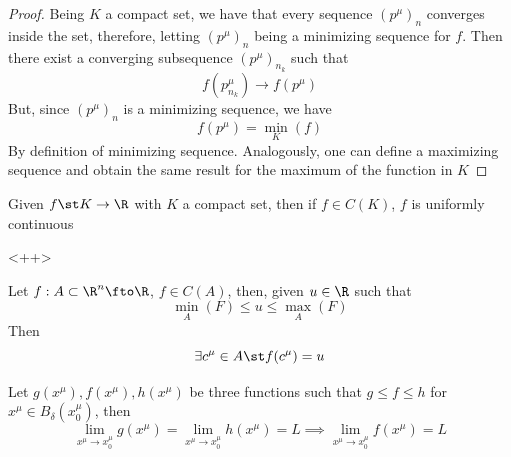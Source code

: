 \documentclass[../mmf.tex]{subfiles}
\begin{document}
\begin{proof}
	Being $K$ a compact set, we have that every sequence $(p^\mu)_n$ converges inside the set, therefore, letting $(p^\mu)_n$ being a minimizing sequence for $f$. Then there exist a converging subsequence $(p^\mu)_{n_k}$ such that
	\begin{equation*}
		f(p^\mu_{n_k})\to f(p^\mu)
	\end{equation*}
	But, since $(p^\mu)_n$ is a minimizing sequence, we have
	\begin{equation*}
		f(p^\mu)=\min_{K}(f)
	\end{equation*}
	By definition of minimizing sequence. Analogously, one can define a maximizing sequence and obtain the same result for the maximum of the function in $K$
\end{proof}
\begin{thm}
	Given $f\st K\to\R$ with $K$ a compact set, then if $f\in C(K)$, $f$ is uniformly continuous
\end{thm}<++>
\begin{thm}
	Let $f:A\subset\R^n\fto\R$, $f\in C(A)$, then, given $u\in\R$ such that
	\begin{equation*}
		\min_A(F)\le u\le\max_A(F)
	\end{equation*}
	Then
	\begin{equation*}
		\exists c^\mu\in A\st f(c^\mu)=u
	\end{equation*}
\end{thm}
\begin{thm}[Squeeze]
	Let $g(x^\mu),f(x^\mu),h(x^\mu)$ be three functions such that $g\le f\le h$ for $x^\mu\in B_\delta(x^\mu_0)$, then
	\begin{equation*}
		\lim_{x^\mu\to x_0^\mu}g(x^\mu)=\lim_{x^\mu\to x_0^\mu}h(x^\mu)=L\implies{}\lim_{x^\mu\to x_0^\mu}f(x^\mu)=L
	\end{equation*}
\end{thm}
\end{document}
